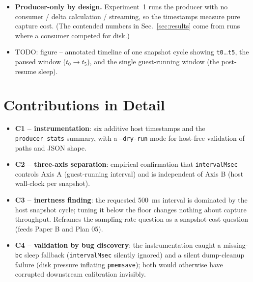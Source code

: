 \documentclass[conference]{IEEEtran}
\begin{document}
\begin{itemize}
        (\texttt{run\_timing\_instrumentation\_experiment.py}; CLI flags
        \texttt{--ram-mb}, \texttt{--duration}, \texttt{--interval-ms},
        \texttt{--keep-dumps}, \texttt{--output-json}) parses the JSONL and
        emits one JSON file with fields:
        \texttt{mean\_pmemsave\_sec},
        \texttt{mean\_host\_snapshot\_cycle\_sec},
        \texttt{mean\_suspend\_sec}, \texttt{mean\_resume\_sec},
        \texttt{mean\_guest\_run\_interval\_sec},
        \texttt{estimated\_vm\_pause\_fraction},
        \texttt{backpressure\_events}, \texttt{queue\_max\_depth}.
        Any field that cannot be measured is recorded as \texttt{null}, never
        guessed.
  \item \textbf{Producer-only by design.} Experiment~1 runs the producer with
        no consumer / delta calculation / streaming, so the timestamps measure
        pure capture cost. (The contended numbers in Sec.~\ref{sec:results}
        come from runs where a consumer competed for disk.)
  \item TODO: figure -- annotated timeline of one snapshot cycle showing
        \texttt{t0}\dots\texttt{t5}, the paused window ($t_0\to t_5$), and the
        single guest-running window (the post-resume sleep).
\end{itemize}

\section{Contributions in Detail}
\label{sec:contrib}
\begin{itemize}
  \item \textbf{C1 -- instrumentation}: six additive host timestamps and the
        \texttt{producer\_stats} summary, with a \texttt{--dry-run} mode for
        host-free validation of paths and JSON shape.
  \item \textbf{C2 -- three-axis separation}: empirical confirmation that
        \texttt{intervalMsec} controls Axis A (guest-running interval) and is
        independent of Axis B (host wall-clock per snapshot).
  \item \textbf{C3 -- inertness finding}: the requested
        \SI{500}{\milli\second} interval is dominated by the host snapshot
        cycle; tuning it below the floor changes nothing about capture
        throughput. Reframes the sampling-rate question as a snapshot-cost
        question (feeds Paper B and Plan 05).
  \item \textbf{C4 -- validation by bug discovery}: the instrumentation caught
        a missing-\texttt{bc} sleep fallback (\texttt{intervalMsec} silently
        ignored) and a silent dump-cleanup failure (disk pressure inflating
        \texttt{pmemsave}); both would otherwise have corrupted downstream
        calibration invisibly.
\end{itemize}
\end{document}
